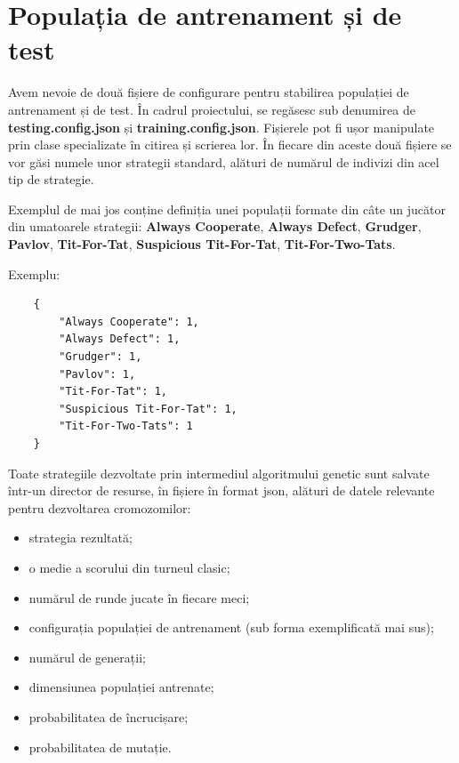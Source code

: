 \section{Populația de antrenament și de test}

Avem nevoie de două fișiere de configurare pentru stabilirea populației de antrenament și de test. În cadrul proiectului, se regăsesc sub denumirea de \textbf{testing.config.json} și \textbf{training.config.json}. Fișierele pot fi ușor manipulate prin clase specializate în citirea și scrierea lor. În fiecare din aceste două fișiere se vor găsi numele unor strategii standard, alături de numărul de indivizi din acel tip de strategie. 

Exemplul de mai jos conține definiția unei populații formate din câte un jucător din umatoarele strategii: \textbf{Always Cooperate}, \textbf{Always Defect}, \textbf{Grudger}, \textbf{Pavlov}, \textbf{Tit-For-Tat}, \textbf{Suspicious Tit-For-Tat}, \textbf{Tit-For-Two-Tats}.

Exemplu: 

\begin{lstlisting}
	{
		"Always Cooperate": 1,
		"Always Defect": 1,
		"Grudger": 1,
		"Pavlov": 1,
		"Tit-For-Tat": 1,
		"Suspicious Tit-For-Tat": 1,
		"Tit-For-Two-Tats": 1
	}
\end{lstlisting}

 
Toate strategiile dezvoltate prin intermediul algoritmului genetic sunt salvate într-un director de resurse, în fișiere în format json, alături de datele relevante pentru dezvoltarea cromozomilor: 
\begin{itemize}
	 \item[\textasteriskcentered] strategia rezultată;
  	 \item[\textasteriskcentered] o medie a scorului din turneul clasic; 
  	 \item[\textasteriskcentered] numărul de runde jucate în fiecare meci;
  	 \item[\textasteriskcentered] configurația populației de antrenament (sub forma exemplificată mai sus);
  	 \item[\textasteriskcentered] numărul de generații; 
  	 \item[\textasteriskcentered] dimensiunea populației antrenate;
  	 \item[\textasteriskcentered] probabilitatea de încrucișare; 
  	 \item[\textasteriskcentered] probabilitatea de mutație. 
\end{itemize} 

